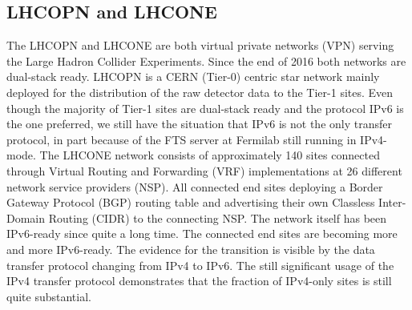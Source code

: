 \subsection{LHCOPN and LHCONE}
The LHCOPN and LHCONE are both virtual private networks (VPN) serving the Large Hadron Collider Experiments. Since the end of 2016 both networks are dual-stack ready. LHCOPN is a CERN (Tier-0) centric star network mainly deployed for the distribution of the raw detector data to the Tier-1 sites. Even though the majority of Tier-1 sites are dual-stack ready and the protocol IPv6 is the one preferred, we still have the situation that IPv6 is not the only transfer protocol, in part because of the FTS server at Fermilab still running in IPv4-mode. The LHCONE network consists of approximately 140 sites connected through Virtual Routing and Forwarding (VRF) implementations at 26 different network service providers (NSP). All connected end sites deploying a Border Gateway Protocol (BGP) routing table and advertising their own Classless Inter-Domain Routing (CIDR) to the connecting NSP. The network itself has been IPv6-ready since quite a long time. The connected end sites are becoming more and more IPv6-ready. The evidence for the transition is visible by the data transfer protocol changing from IPv4 to IPv6. The still significant usage of the IPv4 transfer protocol demonstrates that the fraction of IPv4-only sites is still quite substantial. 
